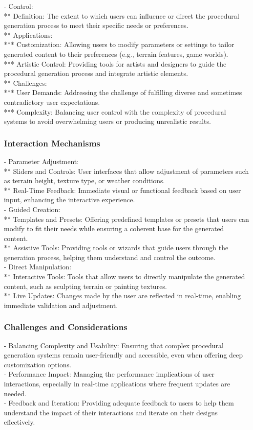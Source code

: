 - Control: \\
** Definition: The extent to which users can influence or direct the procedural generation process to meet their specific needs or preferences. \\
** Applications: \\
*** Customization: Allowing users to modify parameters or settings to tailor generated content to their preferences (e.g., terrain features, game worlds). \\
*** Artistic Control: Providing tools for artists and designers to guide the procedural generation process and integrate artistic elements. \\
** Challenges: \\
*** User Demands: Addressing the challenge of fulfilling diverse and sometimes contradictory user expectations. \\
*** Complexity: Balancing user control with the complexity of procedural systems to avoid overwhelming users or producing unrealistic results. 

\subsubsection{Interaction Mechanisms}
- Parameter Adjustment: \\
** Sliders and Controls: User interfaces that allow adjustment of parameters such as terrain height, texture type, or weather conditions. \\
** Real-Time Feedback: Immediate visual or functional feedback based on user input, enhancing the interactive experience. \\
- Guided Creation: \\
** Templates and Presets: Offering predefined templates or presets that users can modify to fit their needs while ensuring a coherent base for the generated content. \\
** Assistive Tools: Providing tools or wizards that guide users through the generation process, helping them understand and control the outcome. \\
- Direct Manipulation: \\
** Interactive Tools: Tools that allow users to directly manipulate the generated content, such as sculpting terrain or painting textures. \\
** Live Updates: Changes made by the user are reflected in real-time, enabling immediate validation and adjustment. \\
\subsubsection{Challenges and Considerations}
- Balancing Complexity and Usability: Ensuring that complex procedural generation systems remain user-friendly and accessible, even when offering deep customization options. \\
- Performance Impact: Managing the performance implications of user interactions, especially in real-time applications where frequent updates are needed. \\
- Feedback and Iteration: Providing adequate feedback to users to help them understand the impact of their interactions and iterate on their designs effectively.

